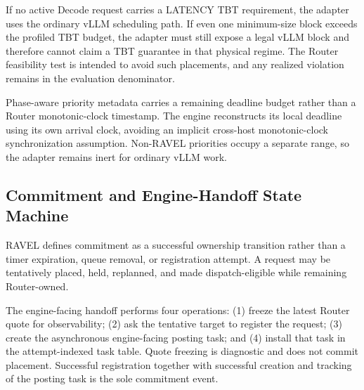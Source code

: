 If no active Decode request carries a LATENCY TBT requirement, the adapter
uses the ordinary vLLM scheduling path.
If even one minimum-size block exceeds the profiled TBT budget, the adapter
must still expose a legal vLLM block and therefore cannot claim a TBT
guarantee in that physical regime.
The Router feasibility test is intended to avoid such placements, and any
realized violation remains in the evaluation denominator.

Phase-aware priority metadata carries a remaining deadline budget rather than
a Router monotonic-clock timestamp.
The engine reconstructs its local deadline using its own arrival clock,
avoiding an implicit cross-host monotonic-clock synchronization assumption.
Non-RAVEL priorities occupy a separate range, so the adapter remains inert for
ordinary vLLM work.


\subsection{Commitment and Engine-Handoff State Machine}
\label{sec:appendix:handoff}

RAVEL defines commitment as a successful ownership transition rather than a
timer expiration, queue removal, or registration attempt.
A request may be tentatively placed, held, replanned, and made
dispatch-eligible while remaining Router-owned.

The engine-facing handoff performs four operations:
(1) freeze the latest Router quote for observability;
(2) ask the tentative target to register the request;
(3) create the asynchronous engine-facing posting task; and
(4) install that task in the attempt-indexed task table.
Quote freezing is diagnostic and does not commit placement.
Successful registration together with successful creation and tracking of the
posting task is the sole commitment event.

